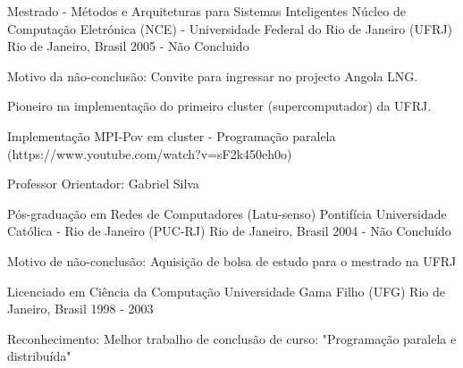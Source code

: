 


\begin{cventries}


\cventry
{Mestrado - Métodos e Arquiteturas para Sistemas Inteligentes} %
{Núcleo de Computação Eletrónica (NCE) - Universidade Federal do Rio de Janeiro (UFRJ)} %
{Rio de Janeiro, Brasil} %
{2005 - Não Concluido} %
{ %
\begin{cvitems}
\item {Motivo da não-conclusão: Convite para ingressar no projecto Angola LNG.}
\item {Pioneiro na implementação do primeiro cluster (supercomputador) da UFRJ.}
\item {Implementação MPI-Pov em cluster - Programação paralela (https://www.youtube.com/watch?v=sF2k450eh0o)}
\item {Professor Orientador: Gabriel Silva}
\end{cvitems}
}


\cventry
{Pós-graduação em Redes de Computadores (Latu-senso)} %
{Pontifícia Universidade Católica - Rio de Janeiro (PUC-RJ)} %
{Rio de Janeiro, Brasil} %
{2004 - Não Concluído} %
{ %
\begin{cvitems}
\item {Motivo de não-conclusão: Aquisição de bolsa de estudo para o mestrado na UFRJ}
\end{cvitems}
}


\cventry
{Licenciado em Ciência da Computação} %
{Universidade Gama Filho (UFG)} %
{Rio de Janeiro, Brasil} %
{1998 - 2003} %
{ %
\begin{cvitems}
\item {Reconhecimento: Melhor trabalho de conclusão de curso: "Programação paralela e distribuída"}
\end{cvitems}
}


\end{cventries}
